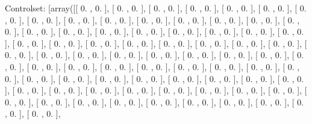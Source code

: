 \documentclass{article}
\begin{document}
Controlset: [array([[ 0.        ,  0.        ],
       [ 0.        ,  0.        ],
       [ 0.        ,  0.        ],
       [ 0.        ,  0.        ],
       [ 0.        ,  0.        ],
       [ 0.        ,  0.        ],
       [ 0.        ,  0.        ],
       [ 0.        ,  0.        ],
       [ 0.        ,  0.        ],
       [ 0.        ,  0.        ],
       [ 0.        ,  0.        ],
       [ 0.        ,  0.        ],
       [ 0.        ,  0.        ],
       [ 0.        ,  0.        ],
       [ 0.        ,  0.        ],
       [ 0.        ,  0.        ],
       [ 0.        ,  0.        ],
       [ 0.        ,  0.        ],
       [ 0.        ,  0.        ],
       [ 0.        ,  0.        ],
       [ 0.        ,  0.        ],
       [ 0.        ,  0.        ],
       [ 0.        ,  0.        ],
       [ 0.        ,  0.        ],
       [ 0.        ,  0.        ],
       [ 0.        ,  0.        ],
       [ 0.        ,  0.        ],
       [ 0.        ,  0.        ],
       [ 0.        ,  0.        ],
       [ 0.        ,  0.        ],
       [ 0.        ,  0.        ],
       [ 0.        ,  0.        ],
       [ 0.        ,  0.        ],
       [ 0.        ,  0.        ],
       [ 0.        ,  0.        ],
       [ 0.        ,  0.        ],
       [ 0.        ,  0.        ],
       [ 0.        ,  0.        ],
       [ 0.        ,  0.        ],
       [ 0.        ,  0.        ],
       [ 0.        ,  0.        ],
       [ 0.        ,  0.        ],
       [ 0.        ,  0.        ],
       [ 0.        ,  0.        ],
       [ 0.        ,  0.        ],
       [ 0.        ,  0.        ],
       [ 0.        ,  0.        ],
       [ 0.        ,  0.        ],
       [ 0.        ,  0.        ],
       [ 0.        ,  0.        ],
       [ 0.        ,  0.        ],
       [ 0.        ,  0.        ],
       [ 0.        ,  0.        ],
       [ 0.        ,  0.        ],
       [ 0.        ,  0.        ],
       [ 0.        ,  0.        ],
       [ 0.        ,  0.        ],
       [ 0.        ,  0.        ],
       [ 0.        ,  0.        ],
       [ 0.        ,  0.        ],
       [ 0.        ,  0.        ],
       [ 0.        ,  0.        ],
       [ 0.        ,  0.        ],
       [ 0.        ,  0.        ],
       [ 0.        ,  0.        ],
       [ 0.        ,  0.        ],
       [ 0.        ,  0.        ],
       [ 0.        ,  0.        ],
       [ 0.        ,  0.        ],
       [ 0.        ,  0.        ],
       [ 0.        ,  0.        ],
       [ 0.        ,  0.        ],
       [ 0.        ,  0.        ],
       [ 0.        ,  0.        ],
\end{document}
